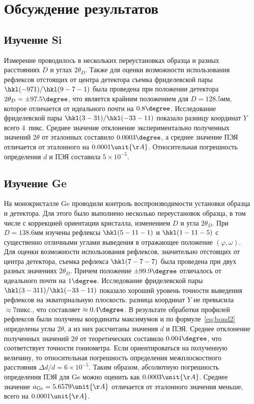 \section{Обсуждение результатов}
\subsection{Изучение Si}
Измерение проводилось в нескольких переустановках образца и разных расстояниях $D$ и углах $2\theta_D$.
Также для оценки возможности использования рефлексов отстоящих от центра детектора съемка фриделевской пары $\hkl(-9 7 1)/\hkl(9 -7 -1)$ была проведена при положении детектора $2\theta_D = \pm 97.5\degree$, что является крайним положением для $D = 128.5\unit{мм}$, которое отличается от идеального почти на $0.8\degree$.
Исследование фриделевской пары $\hkl(3 -3 1)/\hkl(-3 3 -11)$ показало разницу координат $Y$ всего 4~пикс.
Среднее значение отклонение экспериментально полученных значений $2\theta$ от эталонных составило $0.0003\degree$, а среднее значение ПЭЯ отличается от эталонного на $0.0001\unit{\AA}$.
Относительная погрешность определения $d$ и ПЭЯ составила $5 \times 10^{-5}$.
\subsection{Изучение Ge}
На монокристалле Ge проводили контроль воспроизводимости установки образца и детектора.
Для этого было выполнено несколько переустановок образца, в том числе с коррекцией ориентации кристалла, изменением $D$ и угла $2\theta_D$.
При $D = 138.6\unit{мм}$ изучены рефлексы $\hkl(5 -11 -1)$ и $\hkl(1 -11 -5)$ с существенно отличными углами выведения в отражающее положение $(\varphi, \omega)$.
Для оценки возможности использования рефлексов, значительно отстоящих от центра детектора, съемка рефлекса $\hkl(7 -7 -7)$ была проведена при двух разных значениях $2\theta_D$.
Причем положение $\pm 99.9\degree$ отличалось от идеального почти на $1\degree$.
Исследование фриделевской пары $\hkl(3 -3 11)/\hkl(-3 3 -11)$ показало хороший уровень точности выведения рефлексов на экваториальную плоскость: разница координат $Y$ не превысила $\approx 7\unit{пикс.}$, что составляет $\approx 0.4\degree$.
В результате обработки профилей рефлексов были получены координаты максимумов и по формуле~\ref{eq:bond2} определены углы $2\theta$, а из них рассчитаны значения $d$ и ПЭЯ.
Среднее отклонение полученных значений $2\theta$ от теоретических составило $0.004\degree$, что соответствует точности гониометра.
Если ориентироваться на полученную величину, то относительная погрешность определения межплоскостного расстояния $\Delta d / d = 6 \times 10^{-5}$.
Таким образом, абсолютную погрешность определения ПЭЯ для Ge можно оценить как $0.0003\unit{\AA}$.
Среднее значение $a_\text{Ge} = 5.6579\unit{\AA}$ отличается от эталонного значения меньше, всего на $0.0001\unit{\AA}$.
